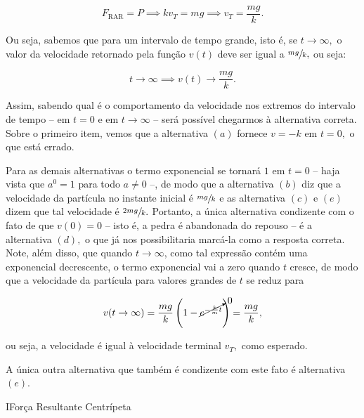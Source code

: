 \begin{exemplo}
\begin{enumerate}
    $$ F_{\text{RAR}}=P \implies kv_{T} = mg \implies v_{T} = \dfrac{mg}{k}.$$

    Ou seja, sabemos que para um intervalo de tempo grande, isto é, se $t \to \infty,$ o valor da velocidade retornado pela função $v(t)$ deve ser igual a $\sfrac{mg}{k},$ ou seja:

    $$ t \to \infty \implies v(t) \to \dfrac{mg}{k}.$$
    
    \end{enumerate}

Assim, sabendo qual é o comportamento da velocidade nos extremos do intervalo de tempo -- em $t=0$ e em $t \to \infty$ -- será possível chegarmos à alternativa correta. Sobre o primeiro item, vemos que a alternativa $(a)$ fornece $v=-k$ em $t=0,$ o que está errado.

Para as demais alternativas o termo exponencial se tornará $1$ em $t=0$ -- haja vista que $a^0=1$ para todo $a \neq 0$ --, de modo que a alternativa $(b)$ diz que a velocidade da partícula no instante inicial é $\sfrac{mg}{k}$ e as alternativa $(c)$ e $(e)$ dizem que tal velocidade é $\sfrac{2mg}{k}.$ Portanto, a única alternativa condizente com o fato de que $v(0)=0$ -- isto é, a pedra é abandonada do repouso -- é a alternativa $(d),$ o que já nos possibilitaria marcá-la como a resposta correta. \\

Note, além disso, que quando $t \to \infty$, como tal expressão contém uma exponencial decrescente, o termo exponencial vai a zero quando $t$ cresce, de modo que a velocidade da partícula para valores grandes de $t$ se reduz para

$$ v(t \to \infty) = \dfrac{mg}{k} \left(1 - \cancelto{0}{e^{-\frac{k}{m}t}}\right) = \dfrac{mg}{k},$$

\noindent ou seja, a velocidade é igual à velocidade terminal $v_T,$ como esperado.

A única outra alternativa que também é condizente com este fato é alternativa $(e).$


\end{exemplo}


\vspace{0.3cm}



\begin{secnivel}{I}{Força Resultante Centrípeta}


\end{secnivel}







